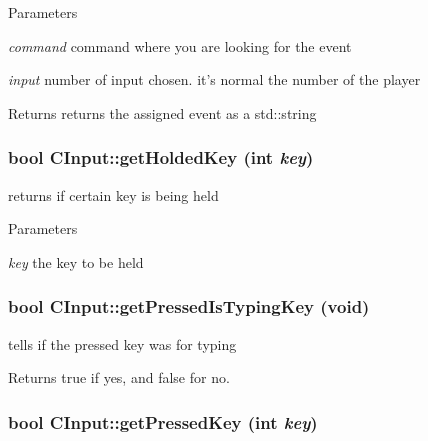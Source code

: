\begin{DoxyParams}{Parameters}
\item[{\em command}]command where you are looking for the event \item[{\em input}]number of input chosen. it's normal the number of the player \end{DoxyParams}
\begin{DoxyReturn}{Returns}
returns the assigned event as a std::string 
\end{DoxyReturn}
\hypertarget{class_c_input_a34acaa475dda28d428b1ab0032d41014}{
\subsubsection[{getHoldedKey}]{\setlength{\rightskip}{0pt plus 5cm}bool CInput::getHoldedKey (int {\em key})}}
\label{class_c_input_a34acaa475dda28d428b1ab0032d41014}


returns if certain key is being held 


\begin{DoxyParams}{Parameters}
\item[{\em key}]the key to be held \end{DoxyParams}
\hypertarget{class_c_input_a359ea2759f63f0b1e6dcae057467e5de}{
\subsubsection[{getPressedIsTypingKey}]{\setlength{\rightskip}{0pt plus 5cm}bool CInput::getPressedIsTypingKey (void)}}
\label{class_c_input_a359ea2759f63f0b1e6dcae057467e5de}


tells if the pressed key was for typing 

\begin{DoxyReturn}{Returns}
true if yes, and false for no. 
\end{DoxyReturn}
\hypertarget{class_c_input_a4eef81156f58990d5c911cb2b1c7af1b}{
\subsubsection[{getPressedKey}]{\setlength{\rightskip}{0pt plus 5cm}bool CInput::getPressedKey (int {\em key})}}
\label{class_c_input_a4eef81156f58990d5c911cb2b1c7af1b}



